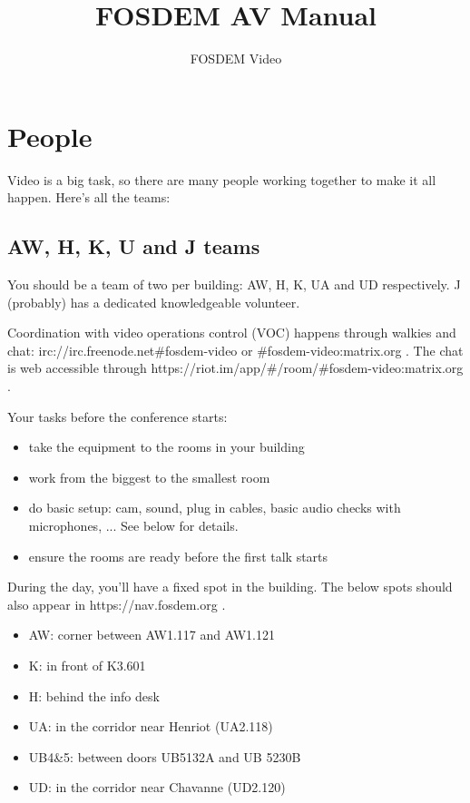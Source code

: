 \documentclass{article}
\title{FOSDEM AV Manual}
\author{FOSDEM Video}
\begin{document}
\maketitle \thispagestyle{empty}
\newpage

\tableofcontents
\newpage

\section{People}
Video is a big task, so there are many people working together to make it all happen. Here's all the teams:

\subsection{AW, H, K, U and J teams}
You should be a team of two per building: AW, H, K, UA and UD respectively. J (probably) has a dedicated knowledgeable volunteer.

Coordination with video operations control (VOC) happens through walkies and chat: irc://irc.freenode.net\#fosdem-video or #fosdem-video:matrix.org . The chat is web accessible through https://riot.im/app/#/room/#fosdem-video:matrix.org .

Your tasks before the conference starts:
\begin{itemize}
  \item take the equipment to the rooms in your building
  \item work from the biggest to the smallest room
  \item do basic setup: cam, sound, plug in cables, basic audio checks with microphones, ... See below for details.
  \item ensure the rooms are ready before the first talk starts
\end{itemize}

During the day, you'll have a fixed spot in the building. The below spots should also appear in https://nav.fosdem.org .
\begin{itemize}
  \item AW: corner between AW1.117 and AW1.121
  \item K: in front of K3.601
  \item H: behind the info desk
  \item UA: in the corridor near Henriot (UA2.118)
  \item UB4&5: between doors UB5132A and UB 5230B
  \item UD: in the corridor near Chavanne (UD2.120)
\end{itemize}
\end{document}
